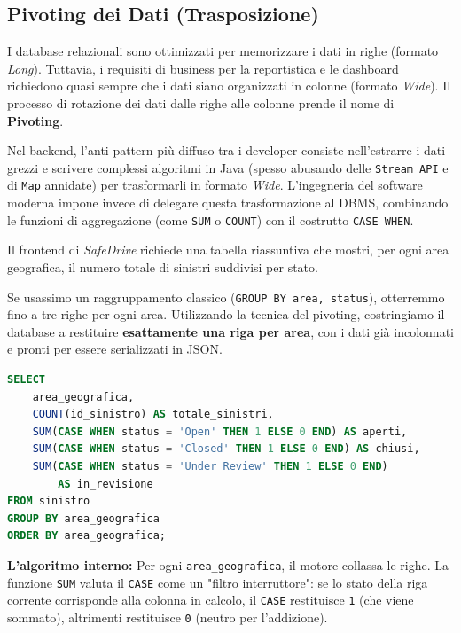 \subsection{Pivoting dei Dati (Trasposizione)}

I database relazionali sono ottimizzati per memorizzare i dati in righe (formato \textit{Long}). Tuttavia, i requisiti di business per la reportistica e le dashboard richiedono quasi sempre che i dati siano organizzati in colonne (formato \textit{Wide}). Il processo di rotazione dei dati dalle righe alle colonne prende il nome di \textbf{Pivoting}.

Nel backend, l'anti-pattern più diffuso tra i developer consiste nell'estrarre i dati grezzi e scrivere complessi algoritmi in Java (spesso abusando delle \texttt{Stream API} e di \texttt{Map} annidate) per trasformarli in formato \textit{Wide}. L'ingegneria del software moderna impone invece di delegare questa trasformazione al DBMS, combinando le funzioni di aggregazione (come \texttt{SUM} o \texttt{COUNT}) con il costrutto \texttt{CASE WHEN}.

\begin{example}
Il frontend di \textit{SafeDrive} richiede una tabella riassuntiva che mostri, per ogni area geografica, il numero totale di sinistri suddivisi per stato. 

Se usassimo un raggruppamento classico (\texttt{GROUP BY area, status}), otterremmo fino a tre righe per ogni area. Utilizzando la tecnica del pivoting, costringiamo il database a restituire \textbf{esattamente una riga per area}, con i dati già incolonnati e pronti per essere serializzati in JSON.

\begin{lstlisting}[language=SQL, basicstyle=\ttfamily\small, keywordstyle=\color{blue}\bfseries]
SELECT 
    area_geografica,
    COUNT(id_sinistro) AS totale_sinistri,
    SUM(CASE WHEN status = 'Open' THEN 1 ELSE 0 END) AS aperti,
    SUM(CASE WHEN status = 'Closed' THEN 1 ELSE 0 END) AS chiusi,
    SUM(CASE WHEN status = 'Under Review' THEN 1 ELSE 0 END)
        AS in_revisione
FROM sinistro
GROUP BY area_geografica
ORDER BY area_geografica;
\end{lstlisting}

\textbf{L'algoritmo interno:} Per ogni \texttt{area\_geografica}, il motore collassa le righe. La funzione \texttt{SUM} valuta il \texttt{CASE} come un "filtro interruttore": se lo stato della riga corrente corrisponde alla colonna in calcolo, il \texttt{CASE} restituisce \texttt{1} (che viene sommato), altrimenti restituisce \texttt{0} (neutro per l'addizione).
\end{example}


